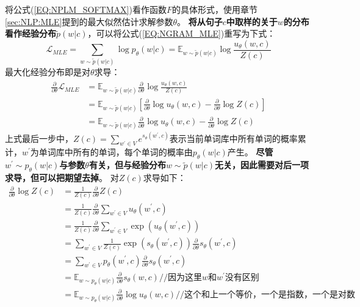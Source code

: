 \documentclass{article}
\begin{document}
将公式(\ref{EQ:NPLM_SOFTMAX})看作函数$F$的具体形式，使用章节\ref{sec:NLP:MLE}提到的最大似然估计求解参数$\theta$。
\textbf{将从句子$c$中取样的关于$w$的分布看作经验分布$\tilde{p}(w|c)$}，可以将公式(\ref{EQ:NGRAM_MLE})重写为下式：
\begin{equation}
    \mathcal{L}_{MLE} = \sum_{w \sim \tilde{p}(w|c)} \log p_\theta (w|c) = \mathbb{E}_{w \sim \tilde{p}(w|c)} \log \frac{u_\theta(w,c)}{Z(c)}
    \label{EQ:NPLM_MLE_EMPRICAL}
\end{equation}
最大化经验分布即是对$\theta$求导：
\begin{equation}
    \begin{split}
        \frac{\partial}{\partial \theta} \mathcal{L}_{MLE} &= \mathbb{E}_{w \sim \tilde{p}(w|c)} \frac{\partial}{\partial \theta} \log \frac{u_\theta (w,c)}{Z(c)} \\
        &= \mathbb{E}_{w \sim \tilde{p}(w|c)} [ \frac{\partial}{\partial \theta} \log u_\theta (w,c) - \frac{\partial}{\partial \theta} \log Z(c)] \\
        &= \mathbb{E}_{w \sim \tilde{p}(w|c)} \frac{\partial}{\partial \theta} \log u_\theta (w,c) - \frac{\partial}{\partial \theta} \log Z(c)
    \end{split}
    \label{EQ:Derive_MLE}
\end{equation}
上式最后一步中，$Z(c)=\sum_{w^{'}\in V}e^{s_\theta(w^{'},c)}$表示当前单词库中所有单词的概率累计，$w^{'}$为单词库中所有的单词，每个单词的概率由$p_\theta(w|c)$产生。
\textbf{尽管$w^{'}\sim p_\theta(w|c)$与参数$\theta$有关，但与经验分布$w \sim \tilde{p}(w|c)$无关，因此需要对后一项求导，但可以把期望去掉}。
对$Z(c)$求导如下：
\begin{equation}
    \begin{split}
        \frac{\partial}{\partial \theta} \log Z(c) &= \frac{1}{Z(c)} \frac{\partial}{\partial \theta}Z(c) \\
        &= \frac{1}{Z(c)} \frac{\partial}{\partial \theta} \sum_{w^{'}\in V} u_\theta(w^{'},c) \\
        &= \frac{1}{Z(c)} \frac{\partial}{\partial \theta} \sum_{w^{'}\in V} \exp(u_\theta(w^{'},c)) \\
        &= \sum_{w^{'} \in V} \frac{1}{Z(c)} \exp(s_\theta(w^{'},c)) \frac{\partial}{\partial \theta}s_\theta(w^{'},c) \\
        &= \sum_{w^{'}\in V} p_\theta (w^{'}, c) \frac{\partial}{\partial \theta}s_\theta(w^{'},c)\\
        &= \mathbb{E}_{w \sim p_\theta (w|c)}\frac{\partial}{\partial \theta} s_\theta (w,c) //\textbf{因为这里$w$和$w^{'}$没有区别} \\
        &= \mathbb{E}_{w \sim p_\theta (w|c)}\frac{\partial}{\partial \theta} \log u_\theta (w,c) //\textbf{这个和上一个等价，一个是指数，一个是对数} \\
    \end{split}
    \label{EQ:Derive_Z}
\end{equation}
\end{document}
